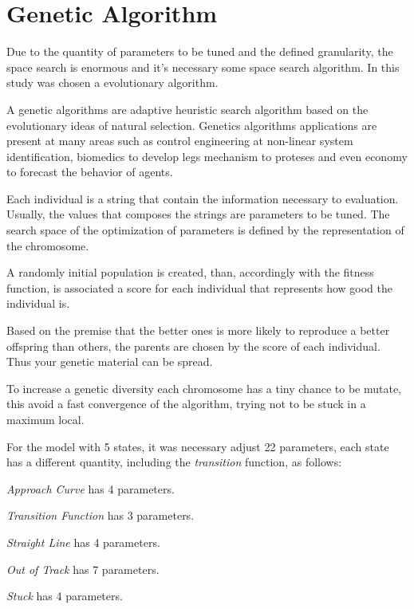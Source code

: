 \section{Genetic Algorithm}
	Due to the quantity of parameters to be tuned and the defined granularity, the space search is enormous and it's necessary some space search algorithm. In this study was chosen a evolutionary algorithm.
	
	
	A genetic algorithms are adaptive heuristic search algorithm based on the evolutionary ideas of natural selection. Genetics algorithms applications are present at many areas such as control engineering at non-linear system identification, biomedics to develop legs mechanism to proteses and even economy to forecast the behavior of agents.  
	
	Each individual is a string that contain the information necessary to evaluation. Usually, the values that composes the strings are parameters to be tuned. The search space of the optimization of parameters is defined by the representation of the chromosome.
		
	
	A randomly initial population is created, than, accordingly with the fitness function, is associated a score for each individual that represents how good the individual is.	
	
	
	Based on the premise that the better ones is more likely to reproduce a better offspring than others, the parents are chosen by the score of each individual. Thus your genetic material can be spread.
	
	
	To increase a genetic diversity each chromosome has a tiny chance to be mutate, this avoid a fast convergence of the algorithm, trying not to be stuck in a maximum local.
	
	
	For the model with 5 states, it was necessary adjust 22 parameters, each state has a different quantity, including the \emph{transition} function, as follows:

	\emph{Approach Curve} has 4 parameters.

	\emph{Transition Function} has 3 parameters.

	\emph{Straight Line} has 4 parameters.

	\emph{Out of Track} has 7 parameters.

	\emph{Stuck} has 4 parameters.
	
	
	
